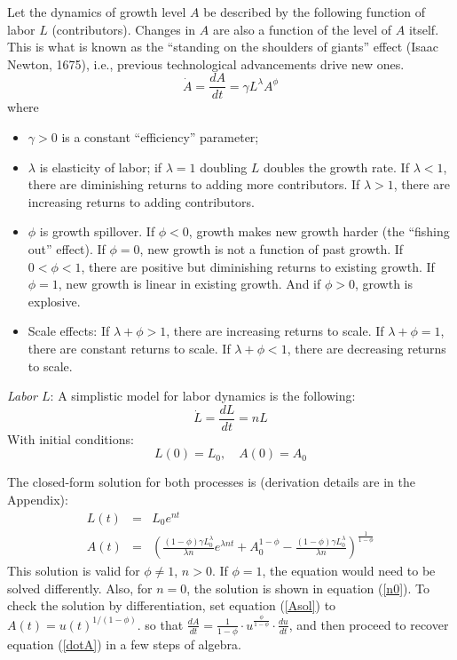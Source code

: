 \documentclass[conference]{IEEEtran}
\begin{document}
Let the dynamics of growth level $A$ be described by the following function of labor $L$ (contributors). Changes in $A$ are also a function of the level of $A$ itself. This is what is known as the ``standing on the shoulders of giants'' effect (Isaac Newton, 1675), i.e., previous technological advancements drive new ones.     
\begin{equation}
{\dot A} = \frac{dA}{dt} = \gamma L^{\lambda} A^{\phi} \label{dotA}    
\end{equation}
where 
\begin{itemize}
\item $\gamma>0$ is a constant ``efficiency'' parameter;
\item $\lambda$ is elasticity of labor; if $\lambda=1$ doubling $L$ doubles the growth rate. If $\lambda<1$, there are diminishing returns to adding more contributors. If $\lambda>1$, there are increasing returns to adding contributors.
\item $\phi$ is growth spillover. If $\phi<0$, growth makes new growth harder (the ``fishing out'' effect). If $\phi=0$, new growth is not a function of past growth. If $0<\phi<1$, there are positive but diminishing returns to existing growth. If $\phi=1$, new growth is linear in existing growth. And if $\phi>0$, growth is explosive.
\item Scale effects: If $\lambda+\phi>1$, there are increasing returns to scale. If $\lambda+\phi=1$, there are constant returns to scale. If $\lambda+\phi<1$, there are decreasing returns to scale.
\end{itemize}
{\it Labor $L$}: A simplistic model for labor dynamics is the following:
\begin{equation}
{\dot L} = \frac{dL}{dt} = n L  \label{dotL}
\end{equation}
With initial conditions:
$$
L(0) = L_0, \quad A(0) = A_0
$$

The closed-form solution for both processes is (derivation details are in the Appendix):
{\small
\begin{eqnarray}
L(t) &=& L_0e^{nt} \label{Lsol}\\
A(t) &=& \left(\frac{(1-\phi)\gamma L_0^\lambda}{\lambda n}e^{\lambda nt} + A_0^{1-\phi} - \frac{(1-\phi)\gamma L_0^\lambda}{\lambda n}\right)^{\frac{1}{1-\phi}}  \label{Asol}
\end{eqnarray}
}
This solution is valid for $\phi \neq 1$, $n>0$. If $\phi = 1$, the equation would need to be solved differently. Also, for $n=0$, the solution is shown in equation (\ref{n0}). To check the solution by differentiation, set equation (\ref{Asol}) to $A(t)=u(t)^{1/(1-\phi)}$. so that $\frac{dA}{dt}=\frac{1}{1-\phi} \cdot u^{\frac{\phi}{1-\phi}} \cdot \frac{du}{dt}$, and then proceed to recover equation (\ref{dotA}) in a few steps of algebra. 
\end{document}
